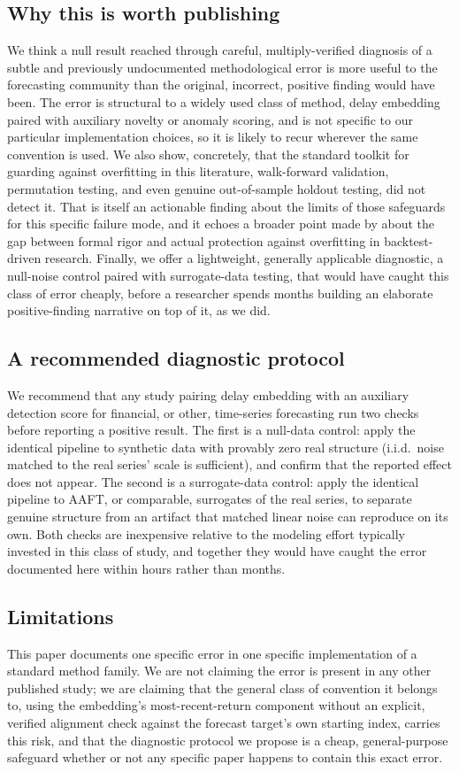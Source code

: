 \documentclass[preprint,12pt]{elsarticle}
\begin{document}
\subsection{Why this is worth publishing}
We think a null result reached through careful, multiply-verified diagnosis of a subtle and
previously undocumented methodological error is more useful to the forecasting community than
the original, incorrect, positive finding would have been. The error is structural to a widely
used class of method, delay embedding paired with auxiliary novelty or anomaly scoring, and is
not specific to our particular implementation choices, so it is likely to recur wherever the
same convention is used. We also show, concretely, that the standard toolkit for guarding
against overfitting in this literature, walk-forward validation, permutation testing, and even
genuine out-of-sample holdout testing, did not detect it. That is itself an actionable finding
about the limits of those safeguards for this specific failure mode, and it echoes a broader
point made by \citet{bailey2014} about the gap between formal rigor and actual protection
against overfitting in backtest-driven research. Finally, we offer a lightweight, generally
applicable diagnostic, a null-noise control paired with surrogate-data testing, that would have
caught this class of error cheaply, before a researcher spends months building an elaborate
positive-finding narrative on top of it, as we did.

\subsection{A recommended diagnostic protocol}
We recommend that any study pairing delay embedding with an auxiliary detection score for
financial, or other, time-series forecasting run two checks before reporting a positive result.
The first is a null-data control: apply the identical pipeline to synthetic data with provably
zero real structure (i.i.d.\ noise matched to the real series' scale is sufficient), and confirm
that the reported effect does not appear. The second is a surrogate-data control: apply the
identical pipeline to AAFT, or comparable, surrogates of the real series, to separate genuine
structure from an artifact that matched linear noise can reproduce on its own. Both checks are
inexpensive relative to the modeling effort typically invested in this class of study, and
together they would have caught the error documented here within hours rather than months.

\subsection{Limitations}
This paper documents one specific error in one specific implementation of a standard method
family. We are not claiming the error is present in any other published study; we are claiming
that the general class of convention it belongs to, using the embedding's most-recent-return
component without an explicit, verified alignment check against the forecast target's own
starting index, carries this risk, and that the diagnostic protocol we propose is a cheap,
general-purpose safeguard whether or not any specific paper happens to contain this exact
error.
\end{document}
